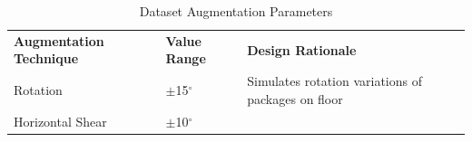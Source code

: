 \documentclass[12pt,a4paper,oneside]{report}
\begin{document}
\begin{longtable}[]{@{}
  >{\raggedright\arraybackslash}p{}
  >{\raggedright\arraybackslash}p{}
  >{\raggedright\arraybackslash}p{}@{}}
\caption{Dataset Augmentation Parameters\label{tab:table12}}\\

\toprule\noalign{}
\begin{minipage}[b]{\linewidth}\raggedright

\textbf{Augmentation Technique}

\end{minipage} & \begin{minipage}[b]{\linewidth}\raggedright

\textbf{Value Range}

\end{minipage} & \begin{minipage}[b]{\linewidth}\raggedright

\textbf{Design Rationale}

\end{minipage} \\
\begin{minipage}[b]{\linewidth}\raggedright

Rotation

\end{minipage} & \begin{minipage}[b]{\linewidth}\raggedright

\emph{$\pm$}15\emph{$^\circ$}

\end{minipage} & \begin{minipage}[b]{\linewidth}\raggedright

Simulates rotation variations of packages on floor

\end{minipage} \\
\begin{minipage}[b]{\linewidth}\raggedright

Horizontal Shear

\end{minipage} & \begin{minipage}[b]{\linewidth}\raggedright

\emph{$\pm$}10\emph{$^\circ$}

\end{minipage} & \begin{minipage}[b]{\linewidth}\raggedright


\end{minipage}
\end{longtable}
\end{document}
